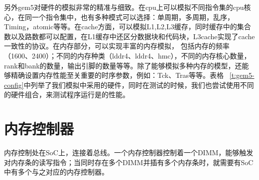 另外gem5对硬件的模拟非常的精准与细致。在cpu上可以模拟不同指令集的cpu核心，在同一个指令集中，也有多种模式可以选择：单周期，多周期，乱序，Timing，atomic等等。在cache方面，可以模拟L1,L2,L3缓存，同时缓存中的集合数以及路数都可以配置，在L1缓存中还区分数据块和代码块，L3cache实现了cache一致性的协议。在内存部分，可以实现丰富的内存模拟，
包括内存的频率（1600、2400）；不同的内存种类（lddr4、lddr4、hmc），不同的内存核心数量，rank和bank的数量，输出引脚的数量等等。除了能够模拟多种内存的模型，还能够精确设置内存性能至关重要的时序参数，例如：Tck、Tras等等。表格 ~\ref{t:gem5-config}中列举了我们模拟中采用的硬件，同时在测试的时候，我们也尝试使用不同的硬件组合，来测试程序运行是的性能。

\section{内存控制器}
内存控制处在SoC上，连接着总线。一个内存控制器控制着一个DIMM，能够触发对内存条的读写指令；当同时存在多个DIMM并插有多个内存条时，就需要有SoC中有多个与之对应的内存控制器。